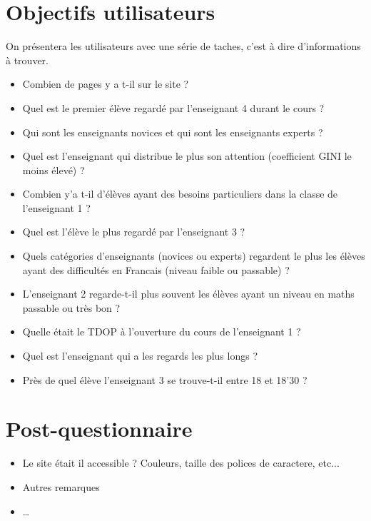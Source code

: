 \documentclass{article}
\begin{document}
\section{Objectifs utilisateurs}
On présentera les utilisateurs avec une série de taches, c'est à dire d'informations à trouver.
\begin{itemize}
    \item Combien de pages y a t-il sur le site ?
    \item Quel est le premier élève regardé par l'enseignant 4 durant le cours ?
    \item Qui sont les enseignants novices et qui sont les enseignants experts ?
    \item Quel est l'enseignant qui distribue le plus son attention (coefficient GINI le moins élevé) ?
    \item Combien y'a t-il d'élèves ayant des besoins particuliers dans la classe de l'enseignant 1 ?
    \item Quel est l'élève le plus regardé par l'enseignant 3 ?
    \item Quels catégories d'enseignants (novices ou experts) regardent le plus les élèves ayant des difficultés en Francais (niveau faible ou passable) ?
    \item L'enseignant 2 regarde-t-il plus souvent les élèves ayant un niveau en maths passable ou très bon ?
    \item Quelle était le TDOP à l'ouverture du cours de l'enseignant 1 ?
    \item Quel est l'enseignant qui a les regards les plus longs ?
    \item Près de quel élève l'enseignant 3 se trouve-t-il entre 18 et 18'30 ?
\end{itemize}

\section{Post-questionnaire}
\begin{itemize}
    \item Le site était il accessible ? Couleurs, taille des polices de caractere, etc...
    \item Autres remarques
    \item \ldots
\end{itemize}
\end{document}
